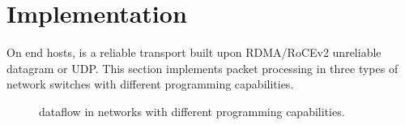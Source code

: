 \section{Implementation}
\label{sec:impl}

On end hosts, \sys is a reliable transport built upon RDMA/RoCEv2 unreliable datagram or UDP.
This section implements packet processing in three types of network switches with different programming capabilities.

\begin{figure}[t]
\centering
{}
\hspace{0.04\textwidth}
\hspace{0.04\textwidth}
\caption{\sys dataflow in networks with different programming capabilities.}
\label{fig:impl}
\vspace{-1em}
\end{figure}

